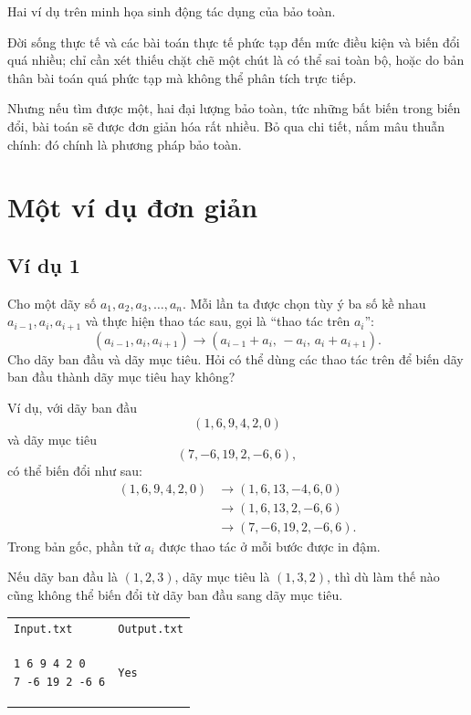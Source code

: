 \documentclass[11pt]{article}
\begin{document}
Hai ví dụ trên minh họa sinh động tác dụng của bảo toàn.

Đời sống thực tế và các bài toán thực tế phức tạp đến mức điều kiện và biến
đổi quá nhiều; chỉ cần xét thiếu chặt chẽ một chút là có thể sai toàn bộ, hoặc
do bản thân bài toán quá phức tạp mà không thể phân tích trực tiếp.

Nhưng nếu tìm được một, hai đại lượng bảo toàn, tức những bất biến trong biến
đổi, bài toán sẽ được đơn giản hóa rất nhiều. Bỏ qua chi tiết, nắm mâu thuẫn
chính: đó chính là phương pháp bảo toàn.

\section{Một ví dụ đơn giản}

\subsection*{Ví dụ 1}

Cho một dãy số \(a_1,a_2,a_3,\ldots,a_n\). Mỗi lần ta được chọn tùy ý ba số
kề nhau \(a_{i-1},a_i,a_{i+1}\) và thực hiện thao tác sau, gọi là ``thao tác
trên \(a_i\)'':
\[
  (a_{i-1},a_i,a_{i+1})
  \to
  (a_{i-1}+a_i,\,-a_i,\,a_i+a_{i+1}).
\]
Cho dãy ban đầu và dãy mục tiêu. Hỏi có thể dùng các thao tác trên để biến dãy
ban đầu thành dãy mục tiêu hay không?

Ví dụ, với dãy ban đầu
\[
  (1,6,9,4,2,0)
\]
và dãy mục tiêu
\[
  (7,-6,19,2,-6,6),
\]
có thể biến đổi như sau:
\[
\begin{aligned}
(1,6,9,4,2,0)&\to(1,6,13,-4,6,0)\\
&\to(1,6,13,2,-6,6)\\
&\to(7,-6,19,2,-6,6).
\end{aligned}
\]
Trong bản gốc, phần tử \(a_i\) được thao tác ở mỗi bước được in đậm.

Nếu dãy ban đầu là \((1,2,3)\), dãy mục tiêu là \((1,3,2)\), thì dù làm thế
nào cũng không thể biến đổi từ dãy ban đầu sang dãy mục tiêu.

\begin{center}
\begin{tabular}{ll}
\texttt{Input.txt} & \texttt{Output.txt}\\
\begin{minipage}{0.35\linewidth}
\begin{verbatim}
1 6 9 4 2 0
7 -6 19 2 -6 6
\end{verbatim}
\end{minipage}
&
\begin{minipage}{0.25\linewidth}
\begin{verbatim}
Yes
\end{verbatim}
\end{minipage}
\end{tabular}
\end{center}
\end{document}
